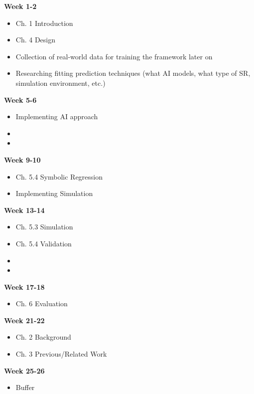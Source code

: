 \documentclass[a4paper,11pt]{article}
\begin{document}
\begin{minipage}[t]{.45\textwidth}
    \textbf{Week 1-2}
    \begin{itemize}
        \item Ch. 1 Introduction
        \item Ch. 4 Design
        \item Collection of real-world data for training the framework later on
        \item Researching fitting prediction techniques (what AI models, what type of SR, simulation environment, etc.)
    \end{itemize}
    \textbf{Week 5-6}
    \begin{itemize}
        \item Implementing AI approach
        \item[]
        \item[]
    \end{itemize}
    \textbf{Week 9-10}
    \begin{itemize}
        \item Ch. 5.4 Symbolic Regression
        \item Implementing Simulation
    \end{itemize}
    \textbf{Week 13-14}
    \begin{itemize}
        \item Ch. 5.3 Simulation
        \item Ch. 5.4 Validation
        \item[]
        \item[]
    \end{itemize}
    \textbf{Week 17-18}
    \begin{itemize}
        \item Ch. 6 Evaluation
    \end{itemize}
    \textbf{Week 21-22}
    \begin{itemize}
        \item Ch. 2 Background
        \item Ch. 3 Previous/Related Work
    \end{itemize}
    \textbf{Week 25-26}
    \begin{itemize}
        \item Buffer
    \end{itemize}
\end{minipage}
\end{document}
